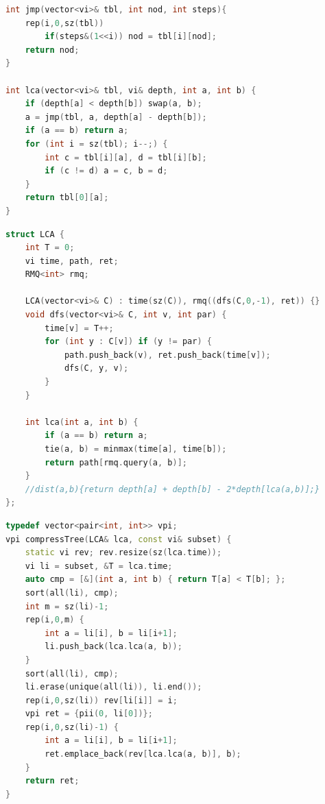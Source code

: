 \begin{multicols}{\Columns}
\begin{lstlisting}[language=C++]
int jmp(vector<vi>& tbl, int nod, int steps){
	rep(i,0,sz(tbl))
		if(steps&(1<<i)) nod = tbl[i][nod];
	return nod;
}

int lca(vector<vi>& tbl, vi& depth, int a, int b) {
	if (depth[a] < depth[b]) swap(a, b);
	a = jmp(tbl, a, depth[a] - depth[b]);
	if (a == b) return a;
	for (int i = sz(tbl); i--;) {
		int c = tbl[i][a], d = tbl[i][b];
		if (c != d) a = c, b = d;
	}
	return tbl[0][a];
}
\end{lstlisting}

\begin{lstlisting}[language=C++]
struct LCA {
	int T = 0;
	vi time, path, ret;
	RMQ<int> rmq;

	LCA(vector<vi>& C) : time(sz(C)), rmq((dfs(C,0,-1), ret)) {}
	void dfs(vector<vi>& C, int v, int par) {
		time[v] = T++;
		for (int y : C[v]) if (y != par) {
			path.push_back(v), ret.push_back(time[v]);
			dfs(C, y, v);
		}
	}

	int lca(int a, int b) {
		if (a == b) return a;
		tie(a, b) = minmax(time[a], time[b]);
		return path[rmq.query(a, b)];
	}
	//dist(a,b){return depth[a] + depth[b] - 2*depth[lca(a,b)];}
};
\end{lstlisting}

\begin{lstlisting}[language=C++]
typedef vector<pair<int, int>> vpi;
vpi compressTree(LCA& lca, const vi& subset) {
	static vi rev; rev.resize(sz(lca.time));
	vi li = subset, &T = lca.time;
	auto cmp = [&](int a, int b) { return T[a] < T[b]; };
	sort(all(li), cmp);
	int m = sz(li)-1;
	rep(i,0,m) {
		int a = li[i], b = li[i+1];
		li.push_back(lca.lca(a, b));
	}
	sort(all(li), cmp);
	li.erase(unique(all(li)), li.end());
	rep(i,0,sz(li)) rev[li[i]] = i;
	vpi ret = {pii(0, li[0])};
	rep(i,0,sz(li)-1) {
		int a = li[i], b = li[i+1];
		ret.emplace_back(rev[lca.lca(a, b)], b);
	}
	return ret;
}
\end{lstlisting}


\end{multicols}
